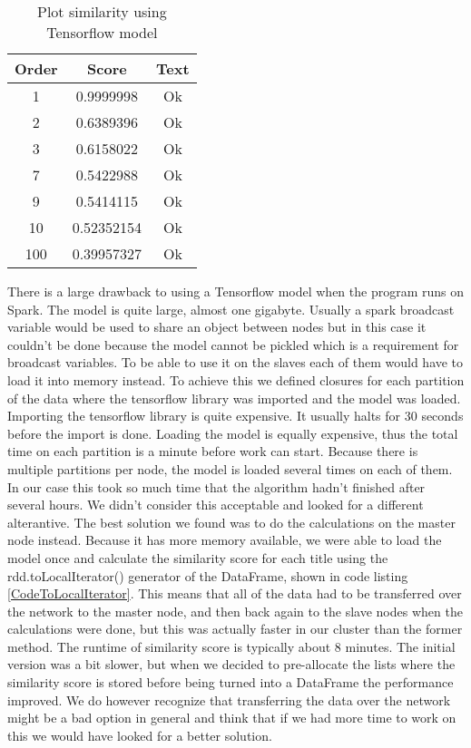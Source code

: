 \begin{table}[H]
    \centering
        \begin{tabular}{ |c|c|c| } 
            \hline
            \textbf{Order} & \textbf{Score} & \textbf{Text} \\ 
            \hline
            1 & 0.9999998 & Ok \\
            2 & 0.6389396 & Ok \\
            3 & 0.6158022 & Ok \\
            7 & 0.5422988 & Ok  \\
            9 & 0.5414115 & Ok \\
            10 & 0.52352154 & Ok \\
            100 & 0.39957327 & Ok \\
            \hline
        \end{tabular}
        \caption{Plot similarity using Tensorflow model}
        \label{tab:tfsim}
\end{table}

There is a large drawback to using a Tensorflow model when the program runs on Spark. The model is quite large, almost one gigabyte. Usually a spark broadcast variable would be used to share an object between nodes but in this case it couldn’t be done because the model cannot be pickled which is a requirement for broadcast variables. To be able to use it on the slaves each of them would have to load it into memory instead. To achieve this we defined closures for each partition of the data where the tensorflow library was imported and the model was loaded. Importing the tensorflow library is quite expensive. It usually halts for 30 seconds before the import is done. Loading the model is equally expensive, thus the total time on each partition is a minute before work can start. Because there is multiple partitions per node, the model is loaded several times on each of them. In our case this took so much time that the algorithm hadn’t finished after several hours. We didn’t consider this acceptable and looked for a different alterantive. The best solution we found was to do the calculations on the master node instead. Because it has more memory available, we were able to load the model once and calculate the similarity score for each title using the rdd.toLocalIterator() generator of the DataFrame, shown in code listing \ref{CodeToLocalIterator}. This means that all of the data had to be transferred over the network to the master node, and then back again to the slave nodes when the calculations were done, but this was actually faster in our cluster than the former method. The runtime of similarity score is typically about 8 minutes. The initial version was a bit slower, but when we decided to pre-allocate the lists where the similarity score is stored before being turned into a DataFrame the performance improved. We do however recognize that transferring the data over the network might be a bad option in general and think that if we had more time to work on this we would have looked for a better solution.



